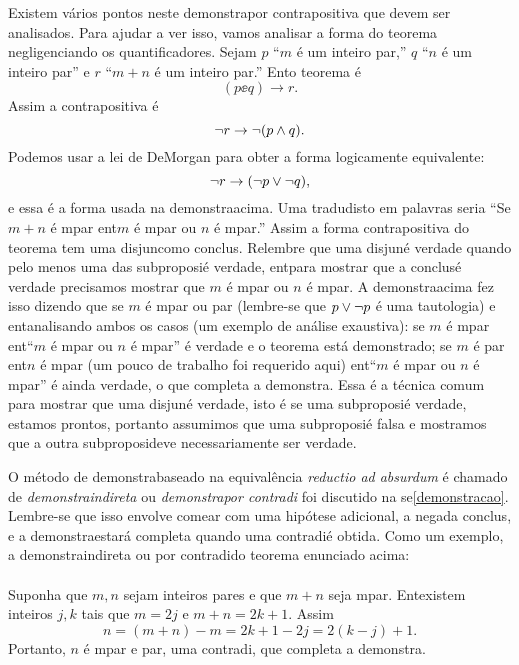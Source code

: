 Existem v\'arios pontos neste demonstra\cao por contrapositiva que devem ser analisados. Para ajudar a ver isso, vamos analisar a forma do teorema negligenciando os quantificadores. Sejam $p$ ``$m$ \'e um inteiro par,'' $q$ ``$n$ \'e um inteiro par'' e $r$ ``$m+n$ \'e um inteiro par.'' Ent\ao o teorema \'e
\[
(p\ee q)\to r.
\]
Assim a contrapositiva \'e 
\[
\lnot r\to\lnot(p\wedge q).
\]
Podemos usar a lei de DeMorgan para obter a forma logicamente equivalente:
\[
\lnot r \to (\lnot p \vee\lnot q),
\]
e essa \'e a forma usada na demonstra\cao acima. Uma tradu\cao disto em palavras seria ``Se $m+n$ \'e \ih mpar ent\ao $m$ \'e \ih mpar ou $n$ \'e \ih mpar.'' Assim a forma contrapositiva do teorema tem uma disjun\cao como conclus\aoi. Relembre que uma disjun\cao \'e verdade quando pelo menos uma das subproposi\coes \'e verdade, ent\ao para mostrar que a conclus\ao \'e verdade precisamos mostrar que $m$ \'e \ih mpar ou $n$ \'e \ih mpar. A demonstra\cao acima fez isso dizendo que se $m$ \'e \ih mpar ou par (lembre-se que $p\vee\lnot p$ \'e uma tautologia) e ent\ao analisando ambos os casos (um exemplo de an\'alise exaustiva): se $m$ \'e \ih mpar ent\ao ``$m$ \'e \ih mpar ou $n$ \'e \ih mpar'' \'e verdade e o teorema est\'a demonstrado; se $m$ \'e par ent\ao $n$ \'e \ih mpar (um pouco de trabalho foi requerido aqui) ent\ao ``$m$ \'e \ih mpar ou $n$ \'e \ih mpar'' \'e ainda verdade, o que completa a demonstra\caoi. Essa \'e a t\'ecnica comum para mostrar que uma disjun\cao \'e verdade, isto \'e se uma subproposi\cao \'e verdade, estamos prontos, portanto assumimos que uma subproposi\cao \'e falsa e mostramos que a outra subproposi\cao deve necessariamente ser verdade.

O m\'etodo de demonstra\cao baseado na equival\^encia {\it reductio ad absurdum} \'e chamado de {\it demonstra\cao indireta} ou {\it demonstra\cao por contradi\cao} foi discutido na se\cao \ref{demonstracao}. Lembre-se que isso envolve  come\cc ar com uma hip\'otese adicional, a nega\cao da conclus\aoi, e a demonstra\cao estar\'a completa quando uma contradi\cao \'e obtida. Como um exemplo, a demonstra\cao indireta ou por contradi\cao do teorema enunciado acima:
\\
\\
{\demo} Suponha que $m,n$ sejam inteiros pares e que $m+n$ seja \ih mpar. Ent\ao existem inteiros $j,k$ tais que $m=2j$ e $m+n=2k+1.$ Assim 
\[
n=(m+n)-m=2k+1-2j=2(k-j)+1.
\]
Portanto, $n$ \'e \ih mpar e par, uma contradi\caoi, que completa a demonstra\caoi.  \fim 

